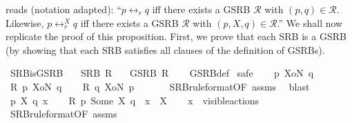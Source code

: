 \begin{isabellebody}
\isanewline
%
\isadelimunimportant
%
\endisadelimunimportant
%
\isatagunimportant
%
\endisatagunimportant
{\isafoldunimportant}%
%
\isadelimunimportant
%
\endisadelimunimportant
%
\isadelimdocument
%
\endisadelimdocument
%
\isatagdocument
%
\isamarkuptrue%
%
\endisatagdocument
{\isafolddocument}%
%
\isadelimdocument
%
\endisadelimdocument
%
\begin{isamarkuptext}%
\cite[Proposition 4]{rbs} reads (notation adapted): \enquote{$p \leftrightarrow_r q$ iff there exists a GSRB $\mathcal{R}$ with $(p,q) \in \mathcal{R}$. Likewise, $p \leftrightarrow_r^X q$ iff there exists a GSRB $\mathcal{R}$ with $(p,X,q) \in \mathcal{R}$.} We shall now replicate the proof of this proposition. First, we prove that each SRB is a GSRB (by showing that each SRB satisfies all clauses of the definition of GSRBs).%
\end{isamarkuptext}\isamarkuptrue%
\isamarkupfalse%
\ SRB{\isacharunderscore}{\kern0pt}is{\isacharunderscore}{\kern0pt}GSRB{\isacharcolon}{\kern0pt}\isanewline
\ \ \ {\isacartoucheopen}SRB\ R{\isacartoucheclose}\isanewline
\ \ \ {\isacartoucheopen}GSRB\ R{\isacartoucheclose}\isanewline
%
\isadelimproof
\ \ %
\endisadelimproof
%
\isatagproof
{}\isamarkupfalse%
\ GSRB{\isacharunderscore}{\kern0pt}def\isanewline
{}\isamarkupfalse%
\ {\isacharparenleft}{\kern0pt}safe{\isacharparenright}{\kern0pt}\isanewline
\ \ \isamarkupfalse%
\ p\ XoN\ q\isanewline
\ \ \isamarkupfalse%
\ {\isacartoucheopen}R\ p\ XoN\ q{\isacartoucheclose}\isanewline
\ \ \isamarkupfalse%
\ {\isacartoucheopen}R\ q\ XoN\ p{\isacartoucheclose}\ \isanewline
\ \ \ \ \isamarkupfalse%
\ SRB{\isacharunderscore}{\kern0pt}ruleformat{\isacharbrackleft}{\kern0pt}OF\ assms{\isacharbrackright}{\kern0pt}\ \isamarkupfalse%
\ blast\isanewline
{}\isamarkupfalse%
\isanewline
\ \ \isamarkupfalse%
\ p\ X\ q\ x\isanewline
\ \ \isamarkupfalse%
\ {\isacartoucheopen}R\ p\ {\isacharparenleft}{\kern0pt}Some\ X{\isacharparenright}{\kern0pt}\ q{\isacartoucheclose}\ \ {\isacartoucheopen}x\ {\isasymin}\ X{\isacartoucheclose}\isanewline
\ \ \isamarkupfalse%
\ {\isacartoucheopen}x\ {\isasymin}\ visible{\isacharunderscore}{\kern0pt}actions{\isacartoucheclose}\ \isanewline
\ \ \ \ \isamarkupfalse%
\ SRB{\isacharunderscore}{\kern0pt}ruleformat{\isacharbrackleft}{\kern0pt}OF\ assms{\isacharbrackright}{\kern0pt}\ \isamarkupfalse%

\end{isabellebody}
